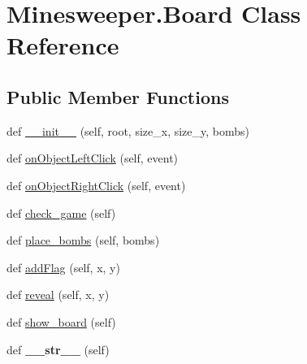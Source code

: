 \hypertarget{class_minesweeper_1_1_board}{}\section{Minesweeper.\+Board Class Reference}
\label{class_minesweeper_1_1_board}
\subsection*{Public Member Functions}
\begin{DoxyCompactItemize}
\item 
def \mbox{\hyperlink{class_minesweeper_1_1_board_a73f4db1b86dab753125ed0a6ca232667}{\+\_\+\+\_\+init\+\_\+\+\_\+}} (self, root, size\+\_\+x, size\+\_\+y, bombs)
\item 
def \mbox{\hyperlink{class_minesweeper_1_1_board_a7e283de1291a4ed985a6099dcbbd4962}{on\+Object\+Left\+Click}} (self, event)
\item 
def \mbox{\hyperlink{class_minesweeper_1_1_board_abce9d7c9117d2e09520dcb5f39642182}{on\+Object\+Right\+Click}} (self, event)
\item 
def \mbox{\hyperlink{class_minesweeper_1_1_board_ac5b393b15aedf45687cc5ed242fd3304}{check\+\_\+game}} (self)
\item 
def \mbox{\hyperlink{class_minesweeper_1_1_board_a98ef006d12ffc5b634a387277b2d4c10}{place\+\_\+bombs}} (self, bombs)
\item 
def \mbox{\hyperlink{class_minesweeper_1_1_board_a5a647633eb873455d51ee3fabde9a07a}{add\+Flag}} (self, x, y)
\item 
def \mbox{\hyperlink{class_minesweeper_1_1_board_aeb82e108501b60f530240d95e7de3ef8}{reveal}} (self, x, y)
\item 
def \mbox{\hyperlink{class_minesweeper_1_1_board_a90957ea377719961be1ab1e7a407e009}{show\+\_\+board}} (self)
\item 
\mbox{\label{class_minesweeper_1_1_board_a80836e2d3c645b3982a57f2eb5f69d98}} 
def {\bfseries \+\_\+\+\_\+str\+\_\+\+\_\+} (self)
\end{DoxyCompactItemize}
